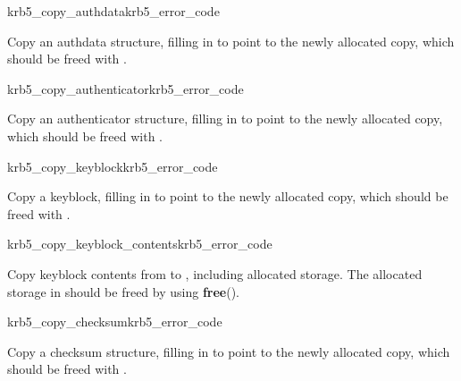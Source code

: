 \begin{funcdecl}{krb5_copy_authdata}{krb5_error_code}{\funcinout}
\funcin
{}
\funcout
{}
\end{funcdecl}

Copy an authdata structure, filling in  to point to the
newly allocated copy, which should be freed with 
.

\begin{funcdecl}{krb5_copy_authenticator}{krb5_error_code}{\funcinout}
\funcin
{}
\funcout
{}
\end{funcdecl}

Copy an authenticator structure, filling in  to
point to the newly allocated copy, which should be freed with 
.

\begin{funcdecl}{krb5_copy_keyblock}{krb5_error_code}{\funcinout}
\funcin
{}
\funcout
{}
\end{funcdecl}

Copy a keyblock, filling in  to point to the newly
allocated copy, which should be freed with
. 

\begin{funcdecl}{krb5_copy_keyblock_contents}{krb5_error_code}{\funcinout}
\funcin
{}
\funcout
{}
\end{funcdecl}

Copy keyblock contents from  to , including
allocated storage.  The allocated storage in  should be
freed by using {\bf free}().

\begin{funcdecl}{krb5_copy_checksum}{krb5_error_code}{\funcinout}
\funcin
{}
\funcout
{}
\end{funcdecl}

Copy a checksum structure, filling in  to point to
the newly allocated copy, which should be freed with
.

